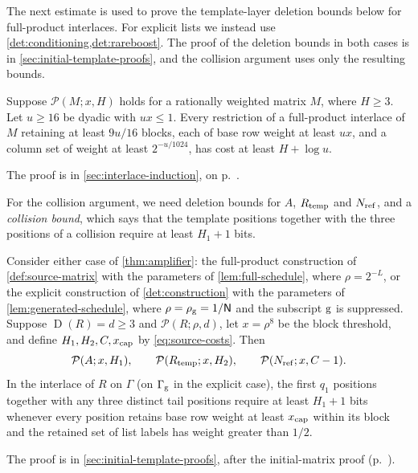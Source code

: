 \documentclass[11pt,letterpaper]{article} \usepackage[utf8]{inputenc}
\theoremstyle{plain} \newtheorem{theorem}{Theorem}[section]
\theoremstyle{definition} \newaliascnt{definition}{theorem}
\newcommand{\D}{\operatorname{D}}
\newcommand{\RP}[3]{\mathcal{P}(#1;#2,#3)}
\begin{document}
The next estimate is used to prove the template-layer deletion bounds
below for full-product interlaces. For explicit lists we instead use
\cref{det:conditioning,det:rareboost}. The proof of the deletion bounds in both cases is in
\cref{sec:initial-template-proofs}, and the collision argument uses only the resulting bounds.

\begin{lemma}\label{lem:many-product-blocks}
Suppose $\RP{M}{x}{H}$ holds for a rationally weighted matrix $M$, where
$H\ge3$. Let $u\ge16$ be dyadic with $ux\le1$. Every restriction of a
full-product interlace of $M$ retaining at least $9u/16$ blocks, each of base row weight at least
$ux$, and a column set of weight at least $2^{-u/1024}$, has cost at least
$H+\log u$.
\end{lemma}

The proof is in \cref{sec:interlace-induction}, on
p.~\pageref{proof:lem:many-product-blocks}.

For the collision argument, we need deletion bounds for $A$, $R_{\rm temp}$
and $N_{\rm ref}$, and a \emph{collision bound}, which says that the template positions
together with the three positions of a collision require at least $H_1+1$ bits.

\begin{lemma}\label{src:profiles}\label{det:profiles}
Consider either case of \cref{thm:amplifier}: the full-product construction of
\cref{def:source-matrix} with the parameters of \cref{lem:full-schedule}, where
$\rho=2^{-L}$, or the explicit construction of \cref{det:construction} with the
parameters of \cref{lem:generated-schedule}, where $\rho=\rho_{\rm g}=1/\mathsf N$
and the subscript $\rm g$ is suppressed. Suppose $\D(R)=d\ge3$ and $\RP{R}{\rho}{d}$,
let $x=\rho^8$ be the block threshold, and define $H_1,H_2,C,x_{\rm cap}$ by
\eqref{eq:source-costs}. Then
\[
\RP{A}{x}{H_1},\qquad \RP{R_{\rm
temp}}{x}{H_2},\qquad \RP{N_{\rm ref}}{x}{C-1}.
\]
In the interlace of $R$ on $\Gamma$ (on $\Gamma_{\rm g}$ in the explicit case),
the first $q_1$ positions together with any three distinct tail positions
require at least $H_1+1$ bits whenever every position retains base row weight
at least $x_{\rm cap}$ within its block and the retained set of list labels
has weight greater than $1/2$.
\end{lemma}

The proof is in \cref{sec:initial-template-proofs}, after the initial-matrix
proof (p.~\pageref{proof:src:profiles}).
\end{document}
